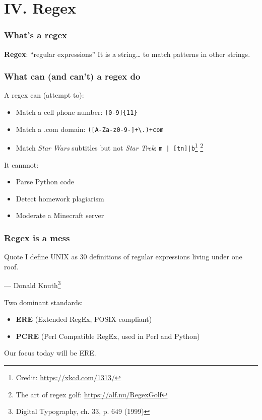 
\section{IV. Regex}
\begin{frame}
\frametitle{What's a regex}
\textbf{Regex}: ``regular expressions''
\newline \newline
It is a string… to match patterns in other strings.
\end{frame}

\begin{frame}[fragile]
\frametitle{What can (and can't) a regex do}
A regex can (attempt to):
\begin{itemize}
    \item Match a cell phone number: \verb|[0-9]{11}|
    \item Match a .com domain: \verb|([A-Za-z0-9-]+\.)+com|
    \item Match \textit{Star Wars} subtitles but not \textit{Star Trek}:
        \verb!m | [tn]|b!\footnote{Credit: \url{https://xkcd.com/1313/}}
        \footnote{The art of regex golf: \url{https://alf.nu/RegexGolf}}
\end{itemize}
It cannnot:
\begin{itemize}
    \item Parse Python code
    \item Detect homework plagiarism
    \item Moderate a Minecraft server
\end{itemize}
\end{frame}

\begin{frame}
\frametitle{Regex is a mess}
\begin{block}{Quote}
I define UNIX as 30 definitions of regular expressions living under one roof.
\begin{flushright}
    — Donald Knuth\footnote{Digital Typography, ch. 33, p. 649 (1999)}
\end{flushright}
\end{block}

Two dominant standards:
\begin{itemize}
    \item \textbf{ERE} (Extended RegEx, POSIX compliant)
    \item \textbf{PCRE} (Perl Compatible RegEx, used in Perl and Python)
\end{itemize}
Our focus today will be ERE.
\end{frame}


